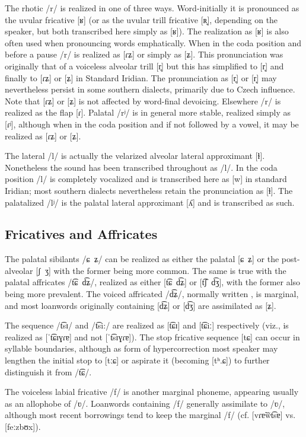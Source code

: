 The rhotic /r/ is realized in one of three ways. Word-initially it is pronounced as the uvular fricative [ʁ] (or as the uvular trill fricative [ʀ̝], depending on the speaker, but both transcribed here simply as [ʁ]). The realization as [ʁ] is also often used when pronouncing words emphatically. When in the coda position and before a pause /r/ is realized as [ɾʑ] or simply as [ʑ]. This pronunciation was originally that of a voiceless alveolar trill [r̥] but this has simplified to [r̝] and finally to [ɾʑ] or [ʑ] in Standard Iridian. The  pronunciation as [r̥] or [r̝] may nevertheless persist in some southern dialects, primarily due to Czech influence. Note that [ɾʑ] or [ʑ] is not affected by word-final devoicing. Elsewhere /r/ is realized as the flap [ɾ]. Palatal /rʲ/ is in general more stable, realized simply as [ɾʲ], although when in the coda position and if not followed by a vowel, it may be realized as [ɾʑ] or [ʑ].

The lateral /l/ is actually the velarized alveolar lateral approximant [ɫ]. Nonetheless the sound has been transcribed throughout as /l/. In the coda position /l/ is completely vocalized and is transcribed here as [w] in standard Iridian; most southern dialects nevertheless retain the pronunciation as [ɫ]. The palatalized /lʲ/ is the palatal lateral approximant [ʎ] and is transcribed as such.

\subsection{Fricatives and Affricates}

The palatal sibilants /ɕ~ʑ/ can be realized as either the palatal [ɕ~ʑ] or the post-alveolar [ʃ~ʒ] with the former being more common. The same is true with the palatal affricates /t͡ɕ~d͡ʑ/, realized as either [t͡ɕ~d͡ʑ] or [t͡ʃ~d͡ʒ], with the former also being more prevalent. The voiced affricated /d͡ʑ/, normally written , is marginal, and most loanwords originally containing [d͡ʑ] or [d͡ʒ] are assimilated as [ʑ].

The sequence /t͡sɪ/ and /t͡si:/ are realized as [t͡ɕɪ] and [t͡ɕiː] respectively (viz.,  is realized as [ˈt͡ɕɪɣɾɐ] and not [ˈt͡sɪɣɾɐ]). The stop fricative sequence [tɕ] can occur in syllable boundaries, although as form of hypercorrection most speaker may lengthen the initial stop to [tːɕ] or aspirate it (becoming [tʰ.ɕ]) to further distinguish it from /t͡ɕ/.

The voiceless labial fricative /f/ is another marginal phoneme, appearing usually as an allophobe of /ʋ/. Loanwords containing /f/ generally assimilate to /ʋ/, although most recent borrowings tend to keep the marginal /f/ (cf.  [vɾɐ̃w̃t͡sɐ] vs.  [feːzbʊx]).

